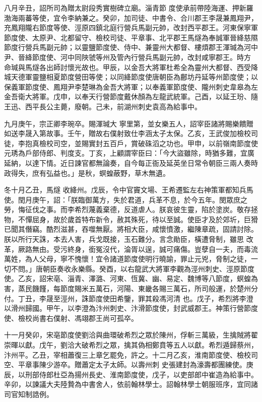\begin{pinyinscope}
 八月辛丑，詔所司為贈太尉段秀實樹碑立廟。淄青節
 度使承前帶陸海運、押新羅渤海兩蕃等使，宜令李納兼之。癸卯，加司徒、中書令、合川郡王李晟兼鳳翔尹，充鳳翔隴右節度等使、涇原四鎮北庭行營兵馬副元帥，改封西平郡王。河東保寧軍節度使、太原尹、北都留守、檢校司徒、平章事、北平郡王馬燧為奉誠軍晉絳慈隰節度行營兵馬副元帥；以靈鹽節度使、侍中、兼靈州大都督、樓煩郡王渾瑊為河中尹、晉絳節度使、河中同陜虢等州及管內行營兵馬副元帥，改封咸寧郡王。時方
 命瑊與馬燧各出師討懷光故也。甲辰，以金吾大將軍杜希全為靈州大都督、西受降城天德軍靈鹽相夏節度營田等使；以同絳節度使唐朝臣為鄜坊丹延等州節度使；以保義軍節度使、鳳翔尹李楚琳為金吾大將軍；以奉義軍節度使、隴州刺史韋皋為左金吾衛大將軍。戊申，以奉天行營節度戴休顏為左龍武統軍。己酉，以延王玢、隨王迅、西平長公主薨，廢朝。己未，前湖州刺史袁高為給事中。



 九月庚午，宗正卿李琬卒。賜渾瑊大
 寧里第，並女樂五人，詔宰臣諸將賜樂饋贈如送李晟入第故事。壬午，贈故右僕射致仕李涵太子太保。乙亥，王武俊加檢校司徒，李抱真檢校司空，並賜實封五百戶，賞破硃滔之功也。甲申，以前嶺南節度使元琇為戶部侍郎、判度支。丁亥，上顧謂宰臣曰：「今大盜雖除，時猶多難，宜廣延納，以達下情。近日諫官都無論奏，自今每正衙及延英坐日常令朝臣三兩人奏時政得失，庶有弘益也。」是秋，螟蝗蔽野，草木無遺。



 冬十月乙丑，馬燧
 收絳州。戊辰，令中官竇文場、王希遷監左右神策軍都知兵馬使。閏月庚午，詔：「朕臨御萬方，失於君道，兵革不息，於今五年。閔眾庶之勞，悔征伐之事。而李希烈蔑義棄德，反道虐人。朕哀彼生靈，陷於塗炭。敬存拯物，不憚屈身，故於歲首特布新令，赦其殊死，待以至誠。使臣才及於郊圻，巨猾已聞其僭竊。酷烈滋甚，吞噬無厭。將相大臣，咸懷憤激，繼陳章疏，固請討除。朕以所行天誅，本去人害，兵戈既接，玉石難分。言念勛臣，橫遭脅制，雖思
 改革，厥路無由。受污終身，銜冤沒代，淪胥以逞，誠可痛傷。豈孽自一夫，而毒流萬姓，為人父母，寧不愧懷！宜令諸道節度使明行曉諭，罪止元兇，脅制之徒，一切不問。」唐朝臣奏收永樂縣。癸酉，以右龍武大將軍李觀為涇州刺史、涇原節度使。乙亥，詔宋亳、淄青、澤潞、河東、恆冀、幽、易定、魏博等八節度，螟蝗為害，蒸民饑饉，每節度賜米五萬石，河陽、東畿各賜三萬石，所司般運，於楚州分付。丁丑，李晟至涇州，誅節度使田希鑒，罪其殺馮河清
 也。戊子，希烈將李澄以滑州歸國。甲午，以李澄為汴州刺史、汴滑節度使，封武威郡王。神策行營節度使、檢校尚書右僕射、馮翊郡王尚可孤卒。



 十一月癸卯，宋亳節度使劉洽與曲環破希烈之眾於陳州，俘斬三萬級，生擒賊將翟崇暉以獻。戊午，劉洽大破希烈之眾，擒其偽相鄭賁等五人以獻。希烈遁歸蔡州，汴州平。乙丑，宰相蕭復三上章乞罷免，許之。十二月乙亥，淮南節度使、檢校司空、平章事陳少游卒。贈蕭定太子太師。以壽州刺
 史張建封為濠壽都團練使。庚辰，以刑部侍郎杜亞為揚州長史、淮南節度使，戊子，以吏部郎中崔造為給事中。辛卯，以諫議大夫陸贄為中書舍人，依前翰林學士。詔翰林學士朝服班序，宜同諸司官知制誥例。




\end{pinyinscope}
